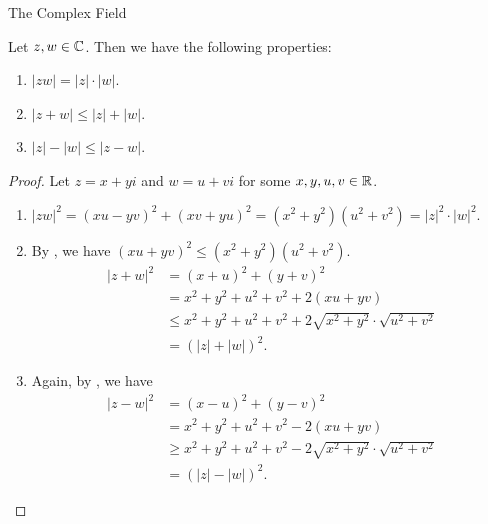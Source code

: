 \begin{section}{The Complex Field}
\begin{theorem} \label{thm:PropertiesOfModulus}
    Let $z, w \in \mathbb{C}$. Then we have the following properties:
    \begin{enumerate}[label=\textbf{(\Alph*)}]
        \item $|zw| = |z| \cdot |w|$.
        \item $|z + w| \leq |z| + |w|$.
        \item $|z| - |w| \leq |z - w|$.
    \end{enumerate}
\end{theorem}

\begin{proof}
    Let $z = x + yi$ and $w = u + vi$ for some $x, y, u, v \in \mathbb{R}$.
    \begin{enumerate}[label=\textbf{(\Alph*)}]
        \item $|zw|^{2} = (xu - yv)^{2} + (xv + yu)^{2} = (x^{2} + y^{2})(u^{2} + v^{2}) = |z|^{2} \cdot |w|^{2}$.
        \item By , we have
        $(xu + yv)^{2} \leq (x^{2} + y^{2})(u^{2} + v^{2})$.
        \begin{align*}
            |z + w|^{2} &= (x + u)^{2} + (y + v)^{2} \\
            &= x^{2} + y^{2} + u^{2} + v^{2} + 2(xu + yv) \\
            &\leq x^{2} + y^{2} + u^{2} + v^{2} + 2\sqrt{x^{2} + y^{2}} \cdot \sqrt{u^{2} + v^{2}} \\
            &= (|z| + |w|)^{2}.
        \end{align*}
        \item Again, by , we have
        \begin{align*}
            |z - w|^{2} &= (x - u)^{2} + (y - v)^{2} \\
            &= x^{2} + y^{2} + u^{2} + v^{2} - 2(xu + yv) \\
            &\geq x^{2} + y^{2} + u^{2} + v^{2} - 2\sqrt{x^{2} + y^{2}} \cdot \sqrt{u^{2} + v^{2}} \\
            &= (|z| - |w|)^{2}.
        \end{align*}
    \end{enumerate}
\end{proof}

\end{section}